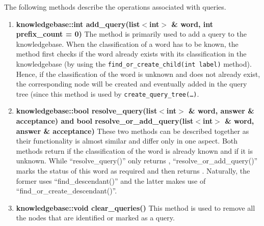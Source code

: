 \vskip 1pt
The following methods describe the operations associated with queries.

\begin{enumerate}

\item \textbf{knowledgebase::int add\_query(list$<$int$>$ \& word, int prefix\_count = 0)} \hfill \vskip 1pt
The method is primarily used to add a query to the knowledgebase. When the classification of a word has to be known, the method first checks if the word already exists with its classification in the knowledgebase (by using the \texttt{find\_or\_create\_child(int label)} method). Hence, if the classification of the word is unknown and does not already exist, the corresponding node will be created and eventually added in the query tree (since this method is used by \texttt{create\_query\_tree(\ldots)}.
  	
\item \textbf{knowledgebase::bool resolve\_query(list$<$int$>$ \& word, answer \& acceptance) and bool resolve\_or\_add\_query(list$<$int$>$ \& word, answer \& acceptance)} \hfill \vskip 1pt
These two methods can be described together as their functionality is almost similar and differ only in one aspect. Both methods return \true if the classification of the word is already known and \false if it is unknown. While ``resolve\_query()'' only returns \false, ``resolve\_or\_add\_query()'' marks the status of this word as required and then returns \false. Naturally, the former uses ``find\_descendant()'' and the latter makes use of ``find\_or\_create\_descendant()''.

\item \textbf{knowledgebase::void clear\_queries()} \hfill \vskip 1pt
This method is used to remove all the nodes that are identified or marked as a query.
\end{enumerate}
\vskip 1pt
\vskip 1pt


